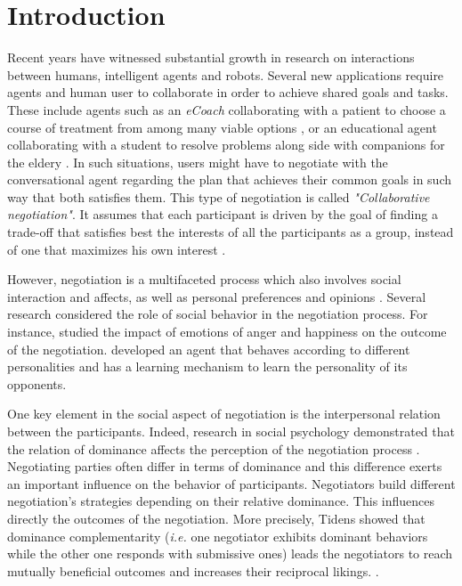 \documentclass[conference, letterpaper]{IEEEtran}
\begin{document}
	\section{Introduction}
		Recent years have witnessed substantial growth in research on interactions between humans, intelligent agents and robots. Several new applications require agents and human user to collaborate in order to achieve shared goals and tasks. These include agents such as an \textit{eCoach} collaborating with a patient to choose a course of treatment from among many viable options \cite{robertson2015visual}, or an educational agent collaborating with a student to resolve problems \cite{howard2017shifting} along side with companions for the eldery \cite{sidner2014robotic}. 
		In such situations, users might have to negotiate with the conversational agent regarding the plan that achieves their common goals in such way that both satisfies them. This type of negotiation is called \emph{"Collaborative negotiation"}. It assumes that each participant is driven by the goal of finding a trade-off that satisfies best the interests of all the participants as a group, instead of one that maximizes his own interest \cite{sidner1994artificial,chu1995response}.
	
		However, negotiation is a multifaceted process which also involves social interaction and affects, as well as personal preferences and opinions  \cite{bro2010affective}. Several research considered the role of social behavior in the negotiation process. For instance, \cite{de2011effect} studied the impact of emotions of anger and happiness on the outcome of the negotiation.  \cite{kraus1995designing} developed an agent that behaves according to different personalities and has a learning mechanism to learn the personality of its opponents. 
	
		One key element in the social aspect of negotiation is the interpersonal relation between the participants. Indeed, research in social psychology demonstrated that the relation of dominance affects the perception of the negotiation process \cite{van2006power}.  
		Negotiating parties often differ in terms of dominance and this difference exerts an important influence on the behavior of participants. Negotiators build different negotiation's strategies depending on their relative dominance. This influences directly the outcomes of the negotiation. More precisely, Tidens \cite{tiedens2003power} showed that dominance complementarity (\emph{i.e.} one negotiator exhibits dominant behaviors while the other one responds with submissive ones) leads the negotiators to reach mutually beneficial outcomes and increases their reciprocal likings. \cite{wiltermuth2015benefits,tiedens2003power}.
	
\end{document}

